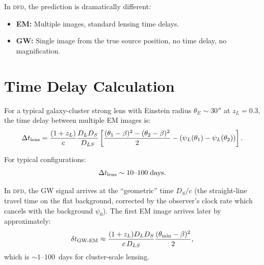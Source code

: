 \documentclass[11pt]{article}
\newcommand{\DFD}{\textsc{dfd}}
\begin{document}
In \DFD, the prediction is dramatically different:
\begin{itemize}[nosep]
\item \textbf{EM:} Multiple images, standard lensing time delays.
\item \textbf{GW:} Single image from the true source position,
  no time delay, no magnification.
\end{itemize}

\section{Time Delay Calculation}

For a typical galaxy-cluster strong lens with Einstein radius
$\theta_E \sim 30''$ at $z_L = 0.3$, the time delay between
multiple EM images is:
\begin{equation}
\Delta t_{\rm lens} = \frac{(1+z_L)}{c}\frac{D_L D_S}{D_{LS}}
\left[\frac{(\theta_1 - \beta)^2 - (\theta_2 - \beta)^2}{2}
- (\psi_L(\theta_1) - \psi_L(\theta_2))\right].
\end{equation}

For typical configurations:
\begin{equation}
\Delta t_{\rm lens} \sim 10\text{--}100\;\text{days}.
\end{equation}

In \DFD, the GW signal arrives at the ``geometric'' time $D_S/c$
(the straight-line travel time on the flat background, corrected
by the observer's clock rate which cancels with the background
$\psi_0$). The first EM image arrives later by approximately:
\begin{equation}
\delta t_{\rm GW\text{-}EM} \approx \frac{(1+z_L)D_L D_S}{c\,D_{LS}}
\frac{(\theta_{\rm min} - \beta)^2}{2},
\end{equation}
which is $\sim 1$--$100$~days for cluster-scale lensing.
\end{document}
